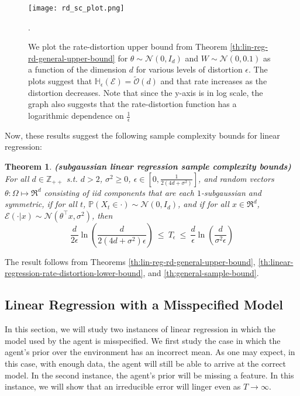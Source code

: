\documentclass[twoside,11pt]{article}
\renewenvironment{proof}{\par\noindent{\bf Proof\ }}{\hfill\BlackBox\\[2mm]}
\newenvironment{proof}{\par\noindent{\bf Proof\ }}{\hfill\BlackBox\\[2mm]}
\newtheorem{theorem}{Theorem}
\def\environment{\mathcal{E}}
\def\normal{\mathcal{N}}
\def\H{\mathbb{H}}
\def\Pr{\mathbb{P}}
\begin{document}
\begin{figure}[!ht]
    \centering
    \texttt{[image: rd\_sc\_plot.png]}
    \caption{We plot the rate-distortion upper bound from Theorem \ref{th:lin-reg-rd-general-upper-bound} for $\theta\sim\normal(0, I_d)$ and $W \sim \normal(0, 0.1)$ as a function of the dimension $d$ for various levels of distortion $\epsilon$.  The plots suggest that $\H_\epsilon(\environment) = \tilde{\mathcal{O}}(d)$ and that rate increases as the distortion decreases. Note that since the y-axis is in log scale, the graph also suggests that the rate-distortion function has a logarithmic dependence on $\frac{1}{\epsilon}$}.
    \label{fig:lin_reg_rd_sc}
\end{figure}
Now, these results suggest the following sample complexity bounds for linear regression:
\begin{theorem}{\bf (subgaussian linear regression sample complexity bounds)}
    For all $d \in \mathbb{Z}_{++}$ s.t. $d > 2$, $\sigma^2 \geq 0$, $\epsilon \in\left[0, \frac{1}{2(4d+\sigma^2)}\right]$, and random vectors $\theta:\Omega\mapsto\Re^d$ consisting of iid components that are each $1$-subgaussian and symmetric, if for all $t$, $\Pr(X_t\in\cdot)\sim \normal(0, I_d)$, and if for all $x \in \Re^d$, $\environment(\cdot|x) \sim \normal(\theta^\top x, \sigma^2)$, then
    $$
    \frac{d}{2\epsilon}\ln\left(\frac{d}{2(4d+\sigma^2)\epsilon}\right)\ \leq\ T_\epsilon\ \leq\ \frac{d}{\epsilon}\ln\left(\frac{d}{\sigma^2\epsilon}\right)$$
\end{theorem}
\begin{proof}
    The result follows from Theorems \ref{th:lin-reg-rd-general-upper-bound}, \ref{th:linear-regression-rate-distortion-lower-bound}, and \ref{th:general-sample-bound}.
\end{proof}

\subsection{Linear Regression with a Misspecified Model}
\label{sec:misspecified_models}

In this section, we will study two instances of linear regression in which the model used by the agent is misspecified. We first study the case in which the agent's prior over the environment has an incorrect mean. As one may expect, in this case, with enough data, the agent will still be able to arrive at the correct model. In the second instance, the agent's prior will be missing a feature. In this instance, we will show that an irreducible error will linger even as $T\rightarrow \infty$.
\end{document}
